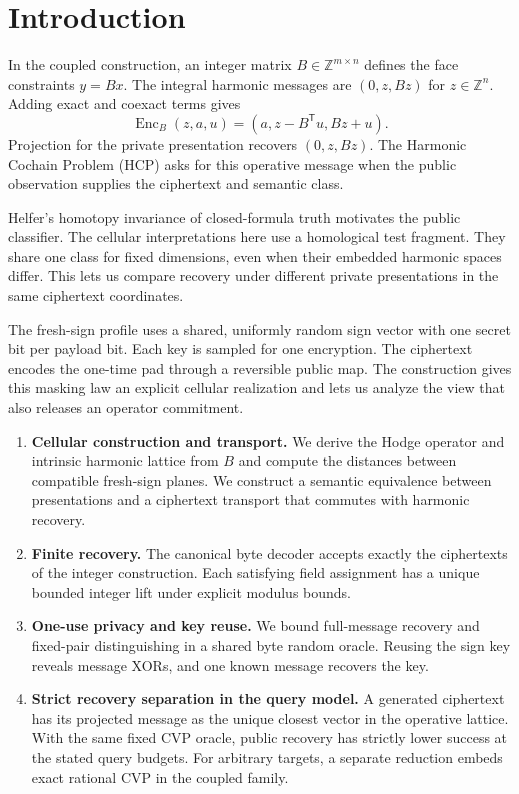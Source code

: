 \section*{Introduction}

In the coupled construction, an integer matrix \(B\in\mathbb Z^{m\times n}\)
defines the face constraints \(y=Bx\). The integral harmonic messages are
\((0,z,Bz)\) for \(z\in\mathbb Z^n\). Adding exact and coexact terms gives
\[
 \operatorname{Enc}_B(z,a,u)=(a,z-B^{\mathsf T}u,Bz+u).
\]
Projection for the private presentation recovers \((0,z,Bz)\). The
Harmonic Cochain Problem (HCP) asks for this operative message when the
public observation supplies the ciphertext and semantic class.

Helfer's homotopy invariance of closed-formula truth
\cite{helfer2019fol} motivates the public classifier. The cellular
interpretations here use a homological test fragment. They share one
class for fixed dimensions, even when their embedded harmonic spaces differ.
This lets us compare recovery under different private presentations in the
same ciphertext coordinates.

The fresh-sign profile uses a shared, uniformly random sign vector with one
secret bit per payload bit. Each key is sampled for one encryption. The
ciphertext encodes the one-time pad through a reversible public map. The
construction gives this masking law an explicit cellular realization and
lets us analyze the view that also releases an operator commitment.

\begin{enumerate}[label=(\roman*)]
  \item \textbf{Cellular construction and transport.}
  We derive the Hodge operator and intrinsic harmonic lattice from \(B\)
  and compute the distances between compatible fresh-sign planes.
  We construct a semantic equivalence between presentations and a
  ciphertext transport that commutes with harmonic recovery.
  \item \textbf{Finite recovery.}
  The canonical byte decoder accepts exactly the ciphertexts of the
  integer construction. Each satisfying field assignment has a unique
  bounded integer lift under explicit modulus bounds.
  \item \textbf{One-use privacy and key reuse.}
  We bound full-message recovery and fixed-pair distinguishing in a
  shared byte random oracle. Reusing the sign key reveals message XORs,
  and one known message recovers the key.
  \item \textbf{Strict recovery separation in the query model.}
  A generated ciphertext has its projected message as the unique
  closest vector in the operative lattice. With the same fixed CVP oracle,
  public recovery has strictly lower success at the stated query budgets.
  For arbitrary targets, a separate reduction embeds exact rational CVP in
  the coupled family.
\end{enumerate}

